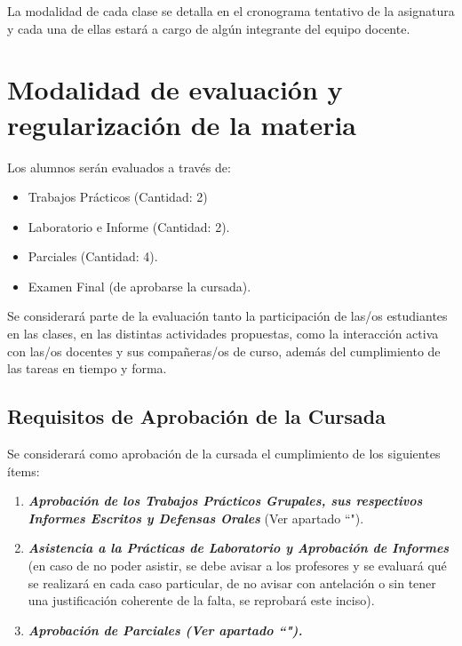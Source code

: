 \documentclass[10pt]{article}
\begin{document}
La modalidad de cada clase se detalla en el cronograma tentativo de la asignatura y cada una de ellas estará a cargo de algún integrante del equipo docente.

\newpage
\section{Modalidad de evaluación y regularización de la materia}
\label{sec:evaluacion}

Los alumnos serán evaluados a través de:

\begin{itemize}
    
    \item Trabajos Prácticos (Cantidad: 2)
    
    \item Laboratorio e Informe (Cantidad: 2).

    \item Parciales (Cantidad: 4).
    
    \item Examen Final (de aprobarse la cursada). 
    
\end{itemize}

Se considerará parte de la evaluación tanto la participación de las/os estudiantes en las clases, en las distintas actividades propuestas, como la interacción activa con las/os docentes y sus compañeras/os de curso, además del cumplimiento de las tareas en tiempo y forma.


\subsection{Requisitos de Aprobación de la Cursada}

Se considerará como aprobación de la cursada el cumplimiento de los siguientes ítems:

\begin{enumerate}
    \item \textbf{\textit{Aprobación de los Trabajos Prácticos Grupales, sus respectivos Informes Escritos y Defensas Orales}} (Ver apartado ``").

    \item \textbf{\textit{Asistencia a la Prácticas de Laboratorio y Aprobación de Informes}} (en caso de no poder asistir, se debe avisar a los profesores y se evaluará qué se realizará en cada caso particular, de no avisar con antelación o sin tener una justificación coherente de la falta, se reprobará este inciso).

    \item \textbf{\textit{Aprobación de Parciales (Ver apartado ``").}} 
    
\end{enumerate}
\end{document}
